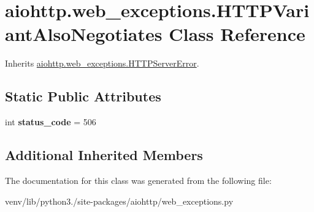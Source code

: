 \hypertarget{classaiohttp_1_1web__exceptions_1_1_h_t_t_p_variant_also_negotiates}{}\section{aiohttp.\+web\+\_\+exceptions.\+H\+T\+T\+P\+Variant\+Also\+Negotiates Class Reference}
\label{classaiohttp_1_1web__exceptions_1_1_h_t_t_p_variant_also_negotiates}


Inherits \hyperlink{classaiohttp_1_1web__exceptions_1_1_h_t_t_p_server_error}{aiohttp.\+web\+\_\+exceptions.\+H\+T\+T\+P\+Server\+Error}.

\subsection*{Static Public Attributes}
\begin{DoxyCompactItemize}
\item 
\mbox{\label{classaiohttp_1_1web__exceptions_1_1_h_t_t_p_variant_also_negotiates_accb8694d89874f0891c4c934d8947d95}} 
int {\bfseries status\+\_\+code} = 506
\end{DoxyCompactItemize}
\subsection*{Additional Inherited Members}


The documentation for this class was generated from the following file\+:\begin{DoxyCompactItemize}
\item 
venv/lib/python3./site-\/packages/aiohttp/web\+\_\+exceptions.\+py\end{DoxyCompactItemize}
